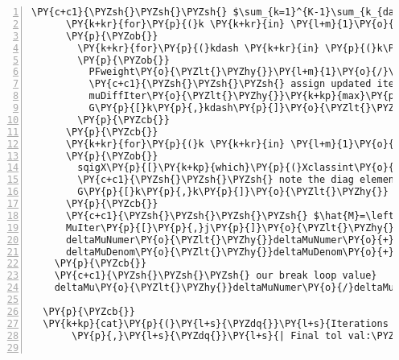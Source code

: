 \begin{Verbatim}[commandchars=\\\{\},codes={\catcode`\$=3\catcode`\^=7\catcode`\_=8},gobble=0,numbers=left,fontfamily=fvm,fontshape=n,fontsize=\footnotesize,tabsize=2]
      \PY{c+c1}{\PYZsh{}\PYZsh{}\PYZsh{} $\sum_{k=1}^{K-1}\sum_{k_{dash}=k+1}^K$}
      \PY{k+kr}{for}\PY{p}{(}k \PY{k+kr}{in} \PY{l+m}{1}\PY{o}{:}\PY{p}{(}K\PY{l+m}{\PYZhy{}1}\PY{p}{)}\PY{p}{)}
      \PY{p}{\PYZob{}}
        \PY{k+kr}{for}\PY{p}{(}kdash \PY{k+kr}{in} \PY{p}{(}k\PY{l+m}{+1}\PY{p}{)}\PY{o}{:}K\PY{p}{)}
        \PY{p}{\PYZob{}}
          PFweight\PY{o}{\PYZlt{}\PYZhy{}}\PY{l+m}{1}\PY{o}{/}\PY{k+kp}{abs}\PY{p}{(}musqig.j\PY{p}{[}k\PY{p}{]}\PY{o}{\PYZhy{}}musqig.j\PY{p}{[}kdash\PY{p}{]}\PY{p}{)}
          \PY{c+c1}{\PYZsh{}\PYZsh{}\PYZsh{} assign updated iterations, or tol value if \PYZdq{}zero\PYZdq{}}
          muDiffIter\PY{o}{\PYZlt{}\PYZhy{}}\PY{k+kp}{max}\PY{p}{(}\PY{k+kp}{abs}\PY{p}{(}beta.t.j\PY{p}{[}k\PY{p}{]}\PY{o}{\PYZhy{}}beta.t.j\PY{p}{[}kdash\PY{p}{]}\PY{p}{)}\PY{p}{,}deltatol\PY{p}{)}
          G\PY{p}{[}k\PY{p}{,}kdash\PY{p}{]}\PY{o}{\PYZlt{}\PYZhy{}}G\PY{p}{[}kdash\PY{p}{,}k\PY{p}{]}\PY{o}{\PYZlt{}\PYZhy{}} \PY{o}{\PYZhy{}}PFweight\PY{o}{/}muDiffIter
        \PY{p}{\PYZcb{}}
      \PY{p}{\PYZcb{}}
      \PY{k+kr}{for}\PY{p}{(}k \PY{k+kr}{in} \PY{l+m}{1}\PY{o}{:}K\PY{p}{)} 
      \PY{p}{\PYZob{}}
        sqigX\PY{p}{[}\PY{k+kp}{which}\PY{p}{(}Xclassint\PY{o}{==}k\PY{p}{)}\PY{p}{,}k\PY{p}{]}\PY{o}{\PYZlt{}\PYZhy{}}\PY{l+m}{1}  
        \PY{c+c1}{\PYZsh{}\PYZsh{}\PYZsh{} note the diag elements of G can be calculated as the sum of the column}
        G\PY{p}{[}k\PY{p}{,}k\PY{p}{]}\PY{o}{\PYZlt{}\PYZhy{}} \PY{o}{\PYZhy{}}\PY{k+kp}{sum}\PY{p}{(}G\PY{p}{[}\PY{p}{,}k\PY{p}{]}\PY{p}{)}
      \PY{p}{\PYZcb{}}
      \PY{c+c1}{\PYZsh{}\PYZsh{}\PYZsh{}\PYZsh{} $\hat{M}=\left(B^TB+\lambda\sigma_j^2G\right)^{-1}B^TJ$}
      MuIter\PY{p}{[}\PY{p}{,}j\PY{p}{]}\PY{o}{\PYZlt{}\PYZhy{}}\PY{k+kp}{solve}\PY{p}{(}\PY{k+kp}{t}\PY{p}{(}sqigX\PY{p}{)}\PY{o}{\PYZpc{}*\PYZpc{}}sqigX\PY{o}{+}lambdar\PY{o}{*}sigmasqs\PY{p}{[}j\PY{p}{]}\PY{o}{*}G\PY{p}{)}\PY{o}{\PYZpc{}*\PYZpc{}}\PY{p}{(}\PY{k+kp}{t}\PY{p}{(}sqigX\PY{p}{)}\PY{o}{\PYZpc{}*\PYZpc{}}sqigY\PY{p}{)}
      deltaMuNumer\PY{o}{\PYZlt{}\PYZhy{}}deltaMuNumer\PY{o}{+}\PY{k+kp}{sum}\PY{p}{(}\PY{k+kp}{abs}\PY{p}{(}MuIter\PY{p}{[}\PY{p}{,}j\PY{p}{]}\PY{o}{\PYZhy{}}beta.t.j\PY{p}{)}\PY{p}{)}
      deltaMuDenom\PY{o}{\PYZlt{}\PYZhy{}}deltaMuDenom\PY{o}{+}\PY{k+kp}{sum}\PY{p}{(}\PY{k+kp}{abs}\PY{p}{(}beta.t.j\PY{p}{)}\PY{p}{)}
    \PY{p}{\PYZcb{}}
    \PY{c+c1}{\PYZsh{}\PYZsh{}\PYZsh{} our break loop value}
    deltaMu\PY{o}{\PYZlt{}\PYZhy{}}deltaMuNumer\PY{o}{/}deltaMuDenom
  
  \PY{p}{\PYZcb{}}
  \PY{k+kp}{cat}\PY{p}{(}\PY{l+s}{\PYZdq{}}\PY{l+s}{Iterations performed to aquire a solution:\PYZdq{}}\PY{p}{,}itcount
       \PY{p}{,}\PY{l+s}{\PYZdq{}}\PY{l+s}{| Final tol val:\PYZdq{}}\PY{p}{,}deltaMu\PY{p}{,}\PY{l+s}{\PYZdq{}}\PY{l+s}{ \PYZbs{}n\PYZdq{}}\PY{p}{)}
  

\end{Verbatim}
